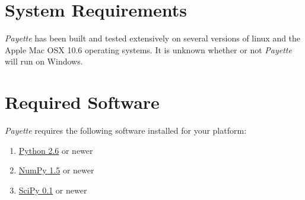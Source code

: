 \documentclass[letterpaper,10pt,english]{sphinxmanual}
\begin{document}
\section{System Requirements}
\label{Files/building:system-requirements}
\emph{Payette} has been built and tested extensively on several versions of linux and
the Apple Mac OSX 10.6 operating systems. It is unknown whether or not \emph{Payette}
will run on Windows.


\section{Required Software}
\label{Files/building:required-software}
\emph{Payette} requires the following software installed for your platform:
\begin{enumerate}
\item {} 
\href{http://www.python.org/}{Python 2.6} or newer

\item {} 
\href{http://www.numpy.org/}{NumPy 1.5} or newer

\item {} 
\href{http://www.scipy.org/}{SciPy 0.1} or newer

\end{enumerate}
\end{document}
